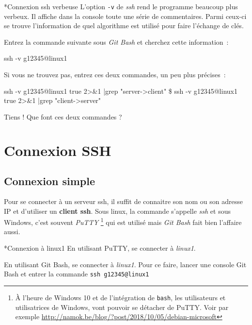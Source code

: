 \documentclass[a4paper,11pt]{article}
\begin{document}
\begin{Exercice}*{Connexion ssh verbeuse}
	L'option \texttt{-v} de \textit{ssh} rend le programme beaucoup plus verbeux.
	Il affiche dans la console toute une série de commentaires. Parmi ceux-ci
	se trouve l'information de quel algorithme est utilisé pour faire
	l'échange de clés. 

	Entrez la commande suivante sous \textit{Git Bash} et cherchez cette
	information~:

	\begin{term}
		ssh -v g12345@linux1
	\end{term}

	Si vous ne trouvez pas, entrez ces deux commandes, un peu plus précises~:

	\begin{term}
		ssh -v g12345@linux1 true 2>\&1 |grep "server->client"
		\$ ssh -v g12345@linux1 true 2>\&1 |grep "client->server"
	\end{term}

	Tiens ! Que font ces deux commandes ? 

\end{Exercice}





\clearpage
\section{Connexion SSH}
\label{connexion-ssh}

\secttoc 

\subsection{Connexion simple}

Pour se connecter à un serveur ssh, il suffit de connaitre son nom ou son
adresse IP et d'utiliser un \textbf{client ssh}. Sous linux, la commande s'appelle \textit{ssh} et sous Windows, c'est souvent \textit{PuTTY}
\footnote{À l'heure de Windows 10 et de l'intégration de \texttt{bash}, les
utilisateurs et utilisatrices de Windows, vont pouvoir se détacher de PuTTY. Voir par exemple \url{http://namok.be/blog/?post/2018/10/05/debian-microsoft}}
qui est utilisé mais \textit{Git Bash} fait bien l'affaire aussi. 

\begin{Exercice}*{Connexion à linux1}
	En utilisant PuTTY, se connecter à \textit{linux1}. 

	En utilisant Git Bash, se connecter à \textit{linux1}. Pour ce faire, lancer
	une console Git Bash et entrer la commande \texttt{ssh g12345@linux1}

\end{Exercice}
\end{document}
